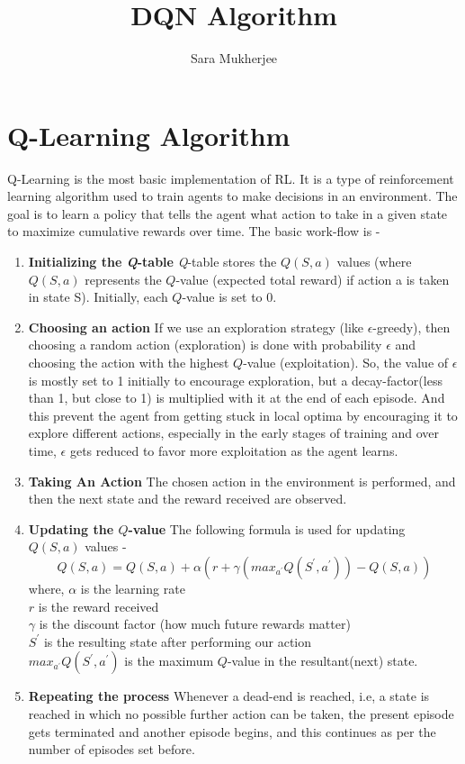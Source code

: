 \documentclass{report}
\title{DQN Algorithm}
\author{Sara Mukherjee}
\begin{document}
\maketitle
\section*{Q-Learning Algorithm}
Q-Learning is the most basic implementation of RL. It is a type of reinforcement learning algorithm used to train agents to make decisions in an environment. The goal is to learn a policy that tells the agent what action to take in a given state to maximize cumulative rewards over time.
The basic work-flow is - 
\begin{enumerate}
    \item \textbf{Initializing the \textit{Q}-table} \textit{Q}-table stores the $Q(S,a)$ values (where $Q(S,a)$ represents the $Q$-value (expected total reward) if action a is taken in state S). Initially, each $Q$-value is set to 0.
    \item \textbf{Choosing an action} If we use an exploration strategy (like $\epsilon$-greedy), then choosing a random action (exploration) is done with probability $\epsilon$ and choosing the action with the highest $Q$-value (exploitation). So, the value of $\epsilon$ is mostly set to 1 initially to encourage exploration, but a decay-factor(less than 1, but close to 1) is multiplied with it at the end of each episode. And this prevent the agent from getting stuck in local optima by encouraging it to explore different actions, especially in the early stages of training and over time, $\epsilon$ gets reduced to favor more exploitation as the agent learns.
    \item \textbf{Taking An Action} The chosen action in the environment is performed, and then the next state and the reward received are observed.
    \item \textbf{Updating the $Q$-value} The following formula is used for updating $Q(S,a)$ values -
    \[Q(S,a) = Q(S,a) + \alpha(r + \gamma(max_{a^\prime}Q(S^\prime, a^\prime)) - Q(S,a))\]
    where, $\alpha$ is the learning rate \\ $r$ is the reward received \\ $\gamma$ is the discount factor (how much future rewards matter) \\ $S^\prime$ is the resulting state after performing our action \\ $max_{a^\prime}Q(S^\prime, a^\prime)$ is the maximum $Q$-value in the resultant(next) state.
    \item \textbf{Repeating the process} Whenever a dead-end is reached, i.e, a state is reached in which no possible further action can be taken, the present episode gets terminated and another episode begins, and this continues as per the number of episodes set before.
\end{enumerate}
\end{document}
